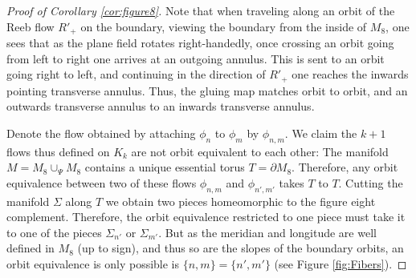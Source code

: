 \documentclass[10pt,a4paper]{amsart}
\begin{document}
\begin{proof}[Proof of Corollary \ref{cor:figure8}]
Note that when traveling along an orbit of the Reeb flow $R'_+$ on the boundary, viewing the boundary from the inside of $M_8$, one sees that as the plane field rotates right-handedly, once crossing an orbit going from left to right one arrives at an outgoing annulus. This is sent to an orbit going right to left, and continuing in the direction of $R'_+$ one reaches the inwards pointing transverse annulus. Thus, the gluing map matches orbit to orbit, and an outwards transverse annulus to an inwards transverse annulus.

Denote the flow obtained by attaching $\phi_n$ to $\phi_m$ by $\phi_{n,m}$.
We claim the $k+1$ flows thus defined on $K_k$ are not orbit equivalent to each other:
The manifold $M=M_8\cup_{\Psi}M_8$ contains a unique essential torus $T=\partial M_8$. Therefore, any orbit equivalence between two of these flows $\phi_{n,m}$ and $\phi_{n',m'}$ takes $T$ to $T$. Cutting the manifold $\Sigma$ along $T$ we obtain two pieces homeomorphic to the figure eight complement. Therefore, the orbit equivalence restricted to one piece must take it to one of the pieces $\Sigma_{n'}$ or $\Sigma_{m'}$. But as the meridian and longitude are well defined in $M_8$ (up to sign), and thus so are the slopes of the boundary orbits, an orbit equivalence is only possible is $\{n,m\}=\{n',m'\}$ (see Figure \ref{fig:Fibers}).
\end{proof}
\end{document}
